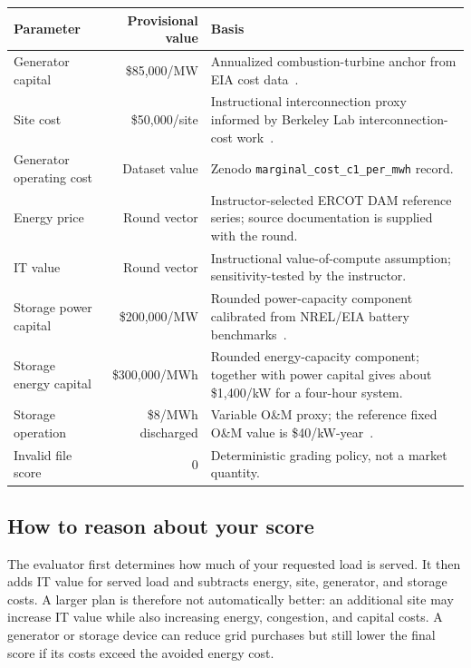 \documentclass[12pt]{article}
\newcommand{\code}[1]{\texttt{#1}}
\newcommand{\USD}{\$}
\begin{document}
\begin{center}
\begin{tabularx}{0.94\textwidth}{>{\ttfamily}l r X}
\toprule
Parameter & Provisional value & Basis\\
\midrule
Generator capital & \USD85,000/MW & Annualized combustion-turbine anchor from EIA cost data~\cite{eia2024generatorcosts}.\\
Site cost & \USD50,000/site & Instructional interconnection proxy informed by Berkeley Lab interconnection-cost work~\cite{lbnl2022interconnection}.\\
Generator operating cost & Dataset value & Zenodo \code{marginal\_cost\_c1\_per\_mwh} record.\\
Energy price & Round vector & Instructor-selected ERCOT DAM reference series; source documentation is supplied with the round.\\
IT value & Round vector & Instructional value-of-compute assumption; sensitivity-tested by the instructor.\\
Storage power capital & \USD200,000/MW & Rounded power-capacity component calibrated from NREL/EIA battery benchmarks~\cite{eia2024bess,nrel2024bess}.\\
Storage energy capital & \USD300,000/MWh & Rounded energy-capacity component; together with power capital gives about \USD1,400/kW for a four-hour system.\\
Storage operation & \USD8/MWh discharged & Variable O\&M proxy; the reference fixed O\&M value is \USD40/kW-year~\cite{eia2024bess}.\\
Invalid file score & 0 & Deterministic grading policy, not a market quantity.\\
\bottomrule
\end{tabularx}
\end{center}

\subsection{How to reason about your score}
The evaluator first determines how much of your requested load is served. It
then adds IT value for served load and subtracts energy, site, generator, and
storage costs. A larger plan is therefore not automatically better: an
additional site may increase IT value while also increasing energy,
congestion, and capital costs. A generator or storage device can reduce grid
purchases but still lower the final score if its costs exceed the avoided
energy cost.
\end{document}
